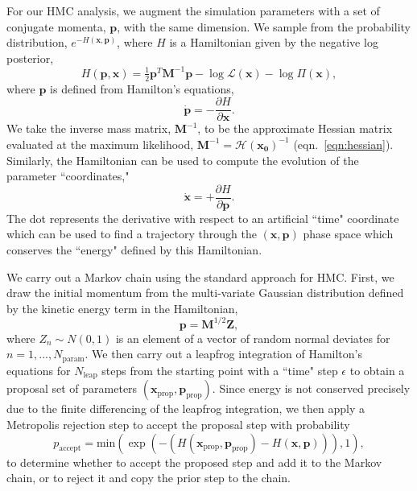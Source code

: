 \documentclass[twocolumn]{aastex63}
\begin{document}

For our HMC analysis, we augment the simulation parameters with a set of conjugate momenta, $\mathbf{p}$, with the same dimension. We sample from the probability distribution, $e^{-H(\mathbf{x},\mathbf{p})}$, where $H$ is a Hamiltonian given by the negative log posterior,
\begin{equation}
    H(\mathbf{p},\mathbf{x}) = \tfrac{1}{2} \mathbf{p}^T \mathbf{M}^{-1} \mathbf{p}
    - \log{\mathcal{L}}(\mathbf{x}) - \log{\Pi(\mathbf{x})},
\end{equation}
where $\mathbf{p}$ is defined from Hamilton's equations,
\begin{equation}
    \dot{\mathbf{p}} = -\frac{\partial H}{\partial \mathbf{x}}.
\end{equation}
We take the inverse mass matrix, $\mathbf{M}^{-1}$, to be the approximate Hessian matrix evaluated at the maximum likelihood, $\mathbf{M}^{-1} = \mathbf{\mathcal{H}(\mathbf{x}_0)}^{-1}$ (eqn.\ \ref{eqn:hessian}).
Similarly, the Hamiltonian can be used to compute the evolution of the parameter ``coordinates,"
\begin{equation}
    \dot{\mathbf{x}} = +\frac{\partial H}{\partial \mathbf{p}}.
\end{equation}
The dot represents the derivative with respect to an artificial ``time" coordinate which can be used to find a trajectory through the $(\mathbf{x},\mathbf{p})$ phase space which conserves the ``energy" defined by this Hamiltonian.

We carry out a Markov chain using the standard approach for HMC. First, we draw the initial momentum from the multi-variate Gaussian distribution defined by the kinetic energy term in the Hamiltonian,
\begin{equation}
    \mathbf{p} = \mathbf{M}^{1/2} \mathbf{Z},
\end{equation}
where $Z_n \sim N(0,1)$ is an element of a vector of random normal deviates for $n=1,...,N_\mathrm{param}$.
We then carry out a leapfrog integration of Hamilton's equations for $N_\mathrm{leap}$ steps from the starting point with a ``time" step $\epsilon$ to obtain a proposal set of parameters $(\mathbf{x}_\mathrm{prop},\mathbf{p}_\mathrm{prop})$.  Since energy is not conserved precisely due to the finite differencing of the leapfrog integration, we then apply a Metropolis rejection step to accept the proposal step with probability
\begin{equation}
    p_\mathrm{accept} = \mathrm{min}(\exp(-(H(\mathbf{x}_\mathrm{prop},\mathbf{p}_\mathrm{prop}) - H(\mathbf{x},\mathbf{p}))),1),
\end{equation}
to determine whether to accept the proposed step and add it to the Markov chain, or to reject it and copy the prior step to the chain.
\end{document}
